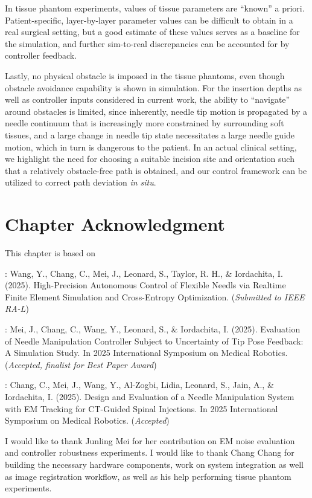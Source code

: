 In tissue phantom experiments, values of tissue parameters are ``known'' a priori. Patient-specific, layer-by-layer parameter values can be difficult to obtain in a real surgical setting, but a good estimate of these values serves as a baseline for the simulation, and further sim-to-real discrepancies can be accounted for by controller feedback.

Lastly, no physical obstacle is  imposed in the tissue phantoms, even though obstacle avoidance capability is shown in simulation. For the insertion depths as well as controller inputs considered in current work, the ability to ``navigate'' around obstacles is limited, since inherently, needle tip motion is propagated by a needle continuum that is increasingly more constrained by surrounding soft tissues, and a large change in needle tip state necessitates a large needle guide motion, which in turn is dangerous to the patient. In an actual clinical setting, we highlight the need for choosing a suitable incision site and orientation such that a relatively obstacle-free path is obtained, and our control framework can be utilized to correct path deviation \textit{in situ}.

\section{Chapter Acknowledgment}
\label{sec:chap-5-ack}

This chapter is based on

\parencite{wangHighPrecisionAutonomousControl2025}: Wang, Y., Chang, C., Mei, J., Leonard, S., Taylor, R. H., \& Iordachita, I. (2025). High-Precision Autonomous Control of Flexible Needls via Realtime Finite Element Simulation and Cross-Entropy Optimization. (\textit{Submitted to IEEE RA-L})

\parencite{meiEvaluationNeedleManipulation2025}: Mei, J., Chang, C., Wang, Y., Leonard, S., \& Iordachita, I. (2025). Evaluation of Needle Manipulation Controller Subject to Uncertainty of Tip Pose Feedback: A Simulation Study. In 2025 International Symposium on Medical Robotics. (\textit{Accepted, finalist for Best Paper Award})

\parencite{changDesignEvaluationNeedle2025}: Chang, C., Mei, J., Wang, Y., Al-Zogbi, Lidia, Leonard, S., Jain, A., \& Iordachita, I. (2025). Design and Evaluation of a Needle Manipulation System with EM Tracking for CT-Guided Spinal Injections. In 2025 International Symposium on Medical Robotics. (\textit{Accepted})

I would like to thank Junling Mei for her contribution on EM noise evaluation and controller robustness experiments. I would like to thank Chang Chang for building the necessary hardware components, work on system integration as well as image registration workflow, as well as his help performing tissue phantom experiments.

